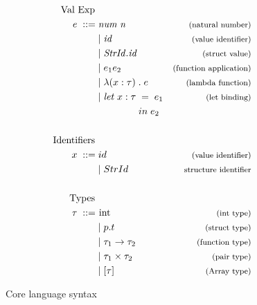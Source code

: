\begin{figure}[htb]
\begin{align*}
\begin{aligned}
\text{Val Exp } \\
e \; ::= \; &\mathit{num \; n \;}     &\expl{(natural number)} \\
&|\;\mathit{id}                       &\expl{(value identifier)}\\
&|\;\mathit{StrId.id}                 &\expl{(struct value)}\\
&|\;e_{1}e_{2}                        & \expl{(function application)}\\
&|\;\lambda(x:\tau)\;.\;e             &\expl{(lambda function)}\\
&|\;\mathit{let }\; x : \tau \; =\; e_{1} 
                                      &\expl{(let binding)}\\
&\longspace \longspace \;\;\; in \; e_{2} \\
\\
\text{Identifiers } \\
x \; ::= \; &id                      & \expl{(value identifier)}\\ 
&|\;StrId                            & \expl{structure identifier}\\
\\
\text{Types }\\
\tau \; ::= \; &\text{\lsttext{int}} &\expl{(int type)}\\
&| \; p.t                            &\expl{(struct type)}\\
&| \; \tau_{1} \rightarrow \tau_{2}  & \expl{(function type)}\\
&| \; \tau_{1} \times \tau_{2}       & \expl{(pair type)}\\
&| \; [\tau]                         & \expl{(Array type)}\\
\end{aligned}
\end{align*}
\caption{Core language syntax\label{fig:CoreSyntax}}
\end{figure}

